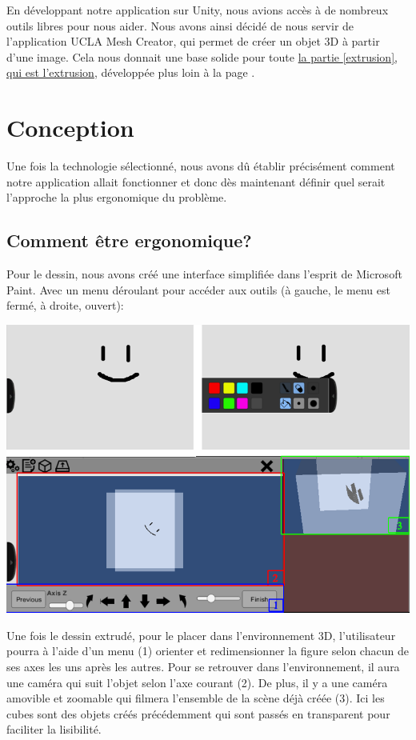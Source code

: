 \documentclass[a4paper,11pt]{article}
\begin{document}
		En développant notre application sur Unity\cite{Unity}, nous avions accès à de nombreux outils libres pour nous aider. Nous avons ainsi décidé de nous servir de l'application UCLA Mesh Creator\cite{UCLA}, qui permet de créer un objet 3D à partir d'une image. Cela nous donnait une base solide pour toute \hyperlink{ancre}{la partie \ref{extrusion}, qui est l'extrusion}, développée plus loin à la page \pageref{extrusion}. 
		
	
		
	\section{Conception}
	
		Une fois la technologie sélectionné, nous avons dû établir précisément comment notre application allait fonctionner et donc dès maintenant définir quel serait l'approche la plus ergonomique du problème.
		
		\subsection{Comment être ergonomique?} %
		Pour le dessin, nous avons créé une interface simplifiée dans l'esprit de Microsoft Paint. Avec un menu déroulant pour accéder aux outils (à gauche, le menu est fermé, à droite, ouvert):
		
		\centerline{\includegraphics[scale=0.65]{images/Cmt_placer2.png}}
		
		 Une fois le dessin extrudé, pour le placer dans l'environnement 3D, l'utilisateur pourra à l'aide d'un menu (1) orienter et redimensionner la figure selon chacun de ses axes les uns après les autres. Pour se retrouver dans l'environnement, il aura une caméra qui suit l'objet selon l'axe courant (2). De plus, il y a une caméra amovible et zoomable qui filmera l'ensemble de la scène déjà créée (3). Ici les cubes sont des objets créés précédemment qui sont passés en transparent pour faciliter la lisibilité.
		\newline
		
\end{document}
